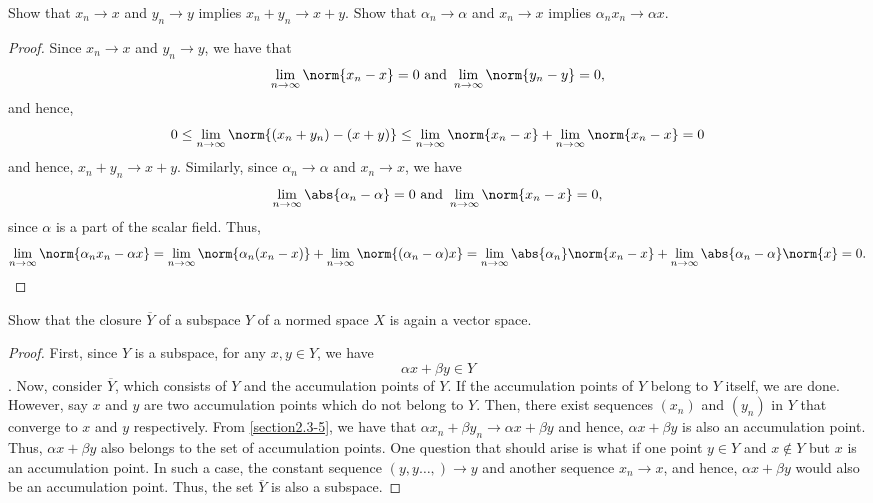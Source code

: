 \begin{question}
    Show that $x_n \rightarrow x$ and $y_n \rightarrow y$ implies $x_n + y_n \rightarrow x + y$. Show that $\alpha_n \rightarrow \alpha$ and $x_n \rightarrow x$ implies $\alpha_n x_n \rightarrow \alpha x$.
    \label{section2.3-5}
\end{question}
\begin{proof}
    Since $x_n \rightarrow x$ and $y_n \rightarrow y$, we have that
    \[\lim_{n \rightarrow \infty} \norm{x_n - x} = 0 \text{ and }\lim_{n \rightarrow \infty} \norm{y_n - y} = 0,\]
    and hence,
    \[0 \leq \lim_{n \rightarrow \infty} \norm{(x_n + y_n) - (x+y)} \leq \lim_{n \rightarrow \infty} \norm{x_n - x} + \lim_{n \rightarrow \infty} \norm{x_n - x} = 0\]
    and hence, $x_n + y_n \rightarrow x + y$.
    Similarly, since $\alpha_n \rightarrow \alpha$ and $x_n \rightarrow x$, we have
    \[\lim_{n \rightarrow \infty} \abs{\alpha_n - \alpha} = 0 \text{ and } \lim_{n \rightarrow \infty} \norm{x_n - x} = 0,\]
    since $\alpha$ is a part of the scalar field. Thus, 
     \[\lim_{n \rightarrow \infty} \norm{\alpha_n x_n - \alpha x} = \lim_{n \rightarrow \infty} \norm{\alpha_n (x_n - x)} + \lim_{n \rightarrow \infty} \norm{(\alpha_n - \alpha)x} =  \lim_{n \rightarrow \infty} \abs{\alpha_n}\norm{x_n - x} + \lim_{n \rightarrow \infty} \abs{\alpha_n - \alpha} \norm{x} = 0.\]
\end{proof}

\begin{question}
    Show that the closure $\overline{Y}$ of a subspace ${Y}$ of a normed space $X$ is again a vector space.
    \label{section2.3-6}
\end{question}
\begin{proof}
    First, since $Y$ is a subspace, for any $x , y \in Y$, we have
    \[\alpha x + \beta y \in Y\].
    Now, consider $\overline{Y}$, which consists of $Y$ and the accumulation points of $Y$. If the accumulation points of $Y$ belong to $Y$ itself, we are done. However, say $x$ and $y$ are two accumulation points which do not belong to $Y$. Then, there exist sequences $(x_n)$ and $(y_n)$ in $Y$ that converge to $x$ and $y$ respectively. From \ref{section2.3-5}, we have that $\alpha x_n + \beta y_n \rightarrow \alpha x + \beta y$ and hence, $\alpha x + \beta y$ is also an accumulation point. Thus, $\alpha x + \beta y$ also belongs to the set of accumulation points. One question that should arise is what if one point $y \in Y$ and $x \notin Y$ but $x$ is an accumulation point. In such a case, the constant sequence $(y,y\ldots,) \rightarrow y$ and another sequence $x_n \rightarrow x$, and hence, $\alpha x + \beta y$ would also be an accumulation point. Thus, the set $\overline{Y}$ is also a subspace.
\end{proof}

